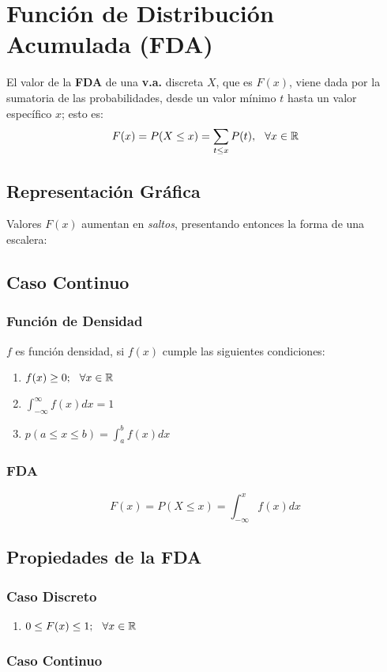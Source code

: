 \section{Función de Distribución Acumulada (FDA)}
El valor de la \textbf{FDA} de una \textbf{v.a.} discreta $X$, que es $F(x)$, viene dada por la sumatoria de las probabilidades, desde un valor mínimo $t$ hasta un valor específico $x$; esto es:
$$F(x)=P(X\leq x)=\displaystyle\sum_{t\leq x} P(t),\hspace{0.25cm} \forall x\in \mathbb{R}$$
\subsection{Representación Gráfica}
Valores $F(x)$ aumentan en \textit{saltos}, presentando entonces la forma de una escalera:
\subsection{Caso Continuo}
\subsubsection{Función de Densidad}
$f$ es función densidad, si $f(x)$ cumple las siguientes condiciones:
\begin{enumerate}[label=(\roman*)]
\item $f(x)\geq 0;\hspace{0.25cm} \forall x\in \mathbb{R}$
\item $\displaystyle\int_{-\infty}^{\infty}f(x) dx = 1$
\item $p(a\leq x \leq b)=\displaystyle\int_{a}^{b}f(x)dx$
\end{enumerate}
\subsubsection{FDA}
$$F(x)=P(X\leq x)=\displaystyle\int_{-\infty}^{x} f(x) dx$$
\subsection{Propiedades de la FDA}
\subsubsection{Caso Discreto}
\begin{enumerate}
\item $0\leq F(x) \leq 1;\hspace{0.25cm}\forall x\in\mathbb{R}$
\end{enumerate}
\subsubsection{Caso Continuo}